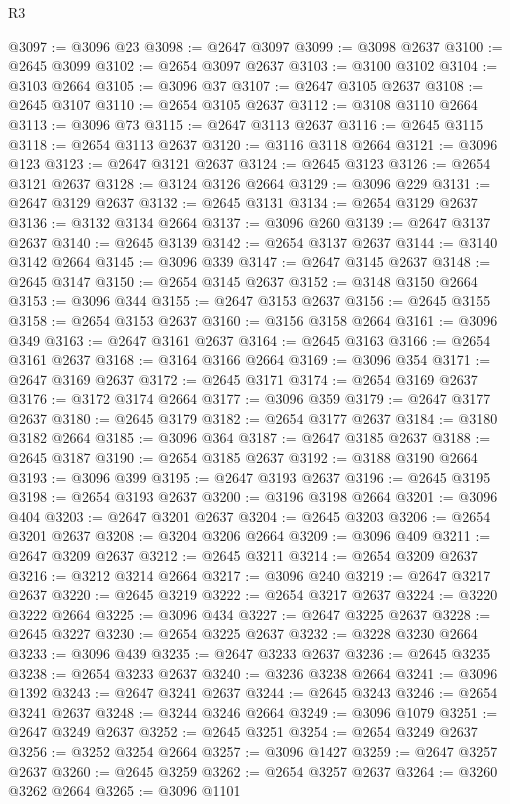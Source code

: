 \begin{lexlean}{R3}
\begin{coremodule}
@3097 := @3096 @23
@3098 := @2647 @3097
@3099 := @3098 @2637
@3100 := @2645 @3099
@3102 := @2654 @3097 @2637
@3103 := @3100 @3102
@3104 := @3103 @2664
@3105 := @3096 @37
@3107 := @2647 @3105 @2637
@3108 := @2645 @3107
@3110 := @2654 @3105 @2637
@3112 := @3108 @3110 @2664
@3113 := @3096 @73
@3115 := @2647 @3113 @2637
@3116 := @2645 @3115
@3118 := @2654 @3113 @2637
@3120 := @3116 @3118 @2664
@3121 := @3096 @123
@3123 := @2647 @3121 @2637
@3124 := @2645 @3123
@3126 := @2654 @3121 @2637
@3128 := @3124 @3126 @2664
@3129 := @3096 @229
@3131 := @2647 @3129 @2637
@3132 := @2645 @3131
@3134 := @2654 @3129 @2637
@3136 := @3132 @3134 @2664
@3137 := @3096 @260
@3139 := @2647 @3137 @2637
@3140 := @2645 @3139
@3142 := @2654 @3137 @2637
@3144 := @3140 @3142 @2664
@3145 := @3096 @339
@3147 := @2647 @3145 @2637
@3148 := @2645 @3147
@3150 := @2654 @3145 @2637
@3152 := @3148 @3150 @2664
@3153 := @3096 @344
@3155 := @2647 @3153 @2637
@3156 := @2645 @3155
@3158 := @2654 @3153 @2637
@3160 := @3156 @3158 @2664
@3161 := @3096 @349
@3163 := @2647 @3161 @2637
@3164 := @2645 @3163
@3166 := @2654 @3161 @2637
@3168 := @3164 @3166 @2664
@3169 := @3096 @354
@3171 := @2647 @3169 @2637
@3172 := @2645 @3171
@3174 := @2654 @3169 @2637
@3176 := @3172 @3174 @2664
@3177 := @3096 @359
@3179 := @2647 @3177 @2637
@3180 := @2645 @3179
@3182 := @2654 @3177 @2637
@3184 := @3180 @3182 @2664
@3185 := @3096 @364
@3187 := @2647 @3185 @2637
@3188 := @2645 @3187
@3190 := @2654 @3185 @2637
@3192 := @3188 @3190 @2664
@3193 := @3096 @399
@3195 := @2647 @3193 @2637
@3196 := @2645 @3195
@3198 := @2654 @3193 @2637
@3200 := @3196 @3198 @2664
@3201 := @3096 @404
@3203 := @2647 @3201 @2637
@3204 := @2645 @3203
@3206 := @2654 @3201 @2637
@3208 := @3204 @3206 @2664
@3209 := @3096 @409
@3211 := @2647 @3209 @2637
@3212 := @2645 @3211
@3214 := @2654 @3209 @2637
@3216 := @3212 @3214 @2664
@3217 := @3096 @240
@3219 := @2647 @3217 @2637
@3220 := @2645 @3219
@3222 := @2654 @3217 @2637
@3224 := @3220 @3222 @2664
@3225 := @3096 @434
@3227 := @2647 @3225 @2637
@3228 := @2645 @3227
@3230 := @2654 @3225 @2637
@3232 := @3228 @3230 @2664
@3233 := @3096 @439
@3235 := @2647 @3233 @2637
@3236 := @2645 @3235
@3238 := @2654 @3233 @2637
@3240 := @3236 @3238 @2664
@3241 := @3096 @1392
@3243 := @2647 @3241 @2637
@3244 := @2645 @3243
@3246 := @2654 @3241 @2637
@3248 := @3244 @3246 @2664
@3249 := @3096 @1079
@3251 := @2647 @3249 @2637
@3252 := @2645 @3251
@3254 := @2654 @3249 @2637
@3256 := @3252 @3254 @2664
@3257 := @3096 @1427
@3259 := @2647 @3257 @2637
@3260 := @2645 @3259
@3262 := @2654 @3257 @2637
@3264 := @3260 @3262 @2664
@3265 := @3096 @1101

\end{coremodule}
\end{lexlean}
